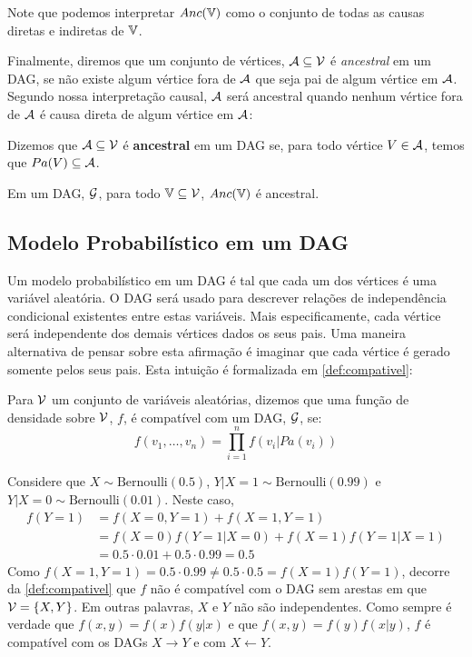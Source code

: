 Note que podemos interpretar $Anc({\mathbb V})$ como
o conjunto de todas as causas diretas e indiretas de ${\mathbb V}$.

Finalmente, diremos que um conjunto de vértices,
${\mathcal A} \subseteq {\mathcal V}$ é \textit{ancestral} em um DAG,
se não existe algum vértice fora de ${\mathcal A}$ que
seja pai de algum vértice em ${\mathcal A}$.
Segundo nossa interpretação causal,
${\mathcal A}$ será ancestral quando 
nenhum vértice fora de ${\mathcal A}$ 
é causa direta de 
algum vértice em ${\mathcal A}$:

\begin{definition}
 \label{def:ancestral}
 Dizemos que ${\mathcal A} \subseteq {\mathcal V}$ é 
 \textbf{ancestral} em um DAG se,
 para todo vértice $V \in {\mathcal A}$, temos que
 $Pa(V) \subseteq {\mathcal A}$.
\end{definition}

\begin{lemma}
 \label{lem:anc}
 Em um DAG, ${\mathcal G}$,
 para todo ${\mathbb V} \subseteq {\mathcal V}$, 
 $Anc({\mathbb V})$ é ancestral.
\end{lemma}

\subsection{Modelo Probabilístico em um DAG}

Um modelo probabilístico em um DAG é
tal que cada um dos vértices é uma variável aleatória.
O DAG será usado para descrever 
relações de independência condicional existentes entre
estas variáveis.
Mais especificamente, cada vértice será
independente dos demais vértices dados os seus pais.
Uma maneira alternativa de pensar sobre esta afirmação é
imaginar que cada vértice é gerado somente pelos seus pais.
Esta intuição é formalizada em \cref{def:compativel}:

\begin{definition}
 \label{def:compativel}
 Para ${\mathcal V}$ um conjunto de variáveis aleatórias,
 dizemos que uma função de densidade sobre ${\mathcal V}$, 
 $f$, é compatível com um DAG, ${\mathcal G}$, se:
 $$f(v_1,\ldots,v_n) = \prod_{i=1}^n f(v_i|Pa(v_i))$$
\end{definition}

\begin{example}
 \label{ex:compativel_1}
 Considere que $X \sim \text{Bernoulli}(0.5)$,
 $Y|X = 1 \sim \text{Bernoulli}(0.99)$ e
 $Y|X = 0 \sim \text{Bernoulli}(0.01)$.
 Neste caso,
 \begin{align*}
  f(Y=1) 
  &= f(X=0,Y=1) + f(X=1,Y=1) \\
  &= f(X=0)f(Y=1|X=0) + f(X=1)f(Y=1|X=1) \\
  &= 0.5 \cdot 0.01 + 0.5 \cdot 0.99 = 0.5
 \end{align*}
 Como $f(X=1,Y=1) = 0.5 \cdot 0.99 \neq 0.5 \cdot 0.5 = f(X=1)f(Y=1)$,
 decorre da \cref{def:compativel} que
 $f$ não é compatível com o DAG sem arestas em que ${\mathcal V} = \{X,Y\}$.
 Em outras palavras, $X$ e $Y$ não são independentes.
 Como sempre é verdade que $f(x,y) = f(x)f(y|x)$ e que
 $f(x,y) = f(y)f(x|y)$, 
 $f$ é compatível com os DAGs 
 $X \rightarrow Y$ e com $X \leftarrow Y$.
\end{example}

